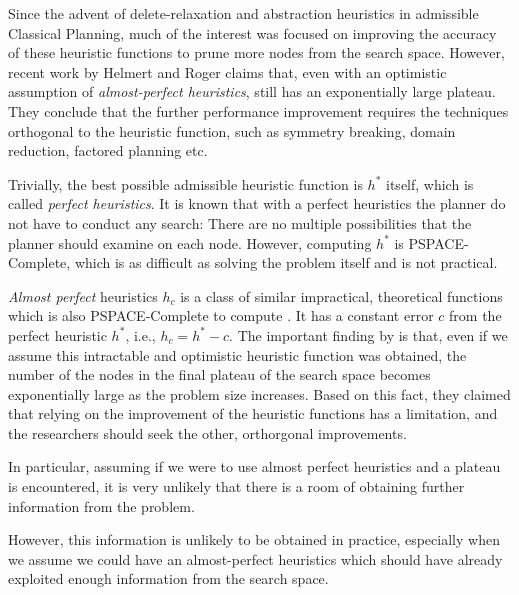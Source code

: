 
Since the advent of delete-relaxation and abstraction heuristics in
admissible Classical Planning, much of the interest was focused on improving
the accuracy of these heuristic functions to prune more nodes from the
search space.
% 
However, recent work by Helmert and Roger
 claims that, even with an optimistic
assumption of \emph{almost-perfect heuristics}, \astar still has an
exponentially large plateau. They conclude that the further performance
improvement requires the techniques orthogonal to the heuristic
function, such as symmetry breaking, domain reduction, factored planning
etc.










Trivially, the best possible admissible heuristic function is $h^*$ itself, which is
called \emph{perfect heuristics}.
It is known that with a perfect heuristics the planner do not have to
conduct any search: There are no multiple possibilities that the
planner should examine on each node.
However, computing $h^*$ is PSPACE-Complete,
which is as difficult as solving the problem itself and is not
practical.

\emph{Almost perfect} heuristics $h_c$ is a class of similar
impractical, theoretical functions which is also PSPACE-Complete to
compute \cite{helmert2008good}.  It has a constant error $c$ from the
perfect heuristic $h^*$, i.e., $h_c=h^*-c$.  The important finding by
\citeauthor{helmert2008good} is that, even if we assume this intractable and
optimistic heuristic function was obtained, the number of the nodes in the final
plateau of the search space becomes exponentially large as the problem size
increases. Based on this fact, they claimed that relying on the
improvement of the heuristic functions has a limitation,
and the researchers should seek the other, orthorgonal improvements.






In particular, assuming if we were to use almost
perfect heuristics and a plateau is encountered, it is very unlikely
that there is a room of obtaining further information from the problem.



However, this information is unlikely to be obtained in
practice, especially when we assume we could have an almost-perfect heuristics
which should have already exploited enough information from the search space.
